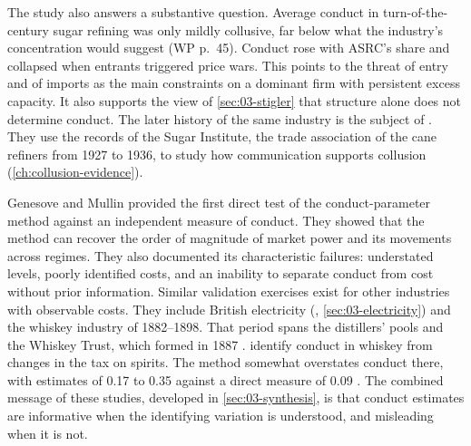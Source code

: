 The study also answers a substantive question. Average conduct in turn-of-the-century sugar refining was
only mildly collusive, far below what the industry's concentration would suggest (WP p.~45). Conduct rose
with ASRC's share and collapsed when entrants triggered price wars. This points to the threat of entry and
of imports as the main constraints on a dominant firm with persistent excess capacity. It also supports the
view of \cref{sec:03-stigler} that structure alone does not determine conduct. The later history of the same
industry is the subject of \citet{GenesoveMullin2001}. They use the records of the Sugar Institute, the
trade association of the cane refiners from 1927 to 1936, to study how communication supports collusion
(\cref{ch:collusion-evidence}).

Genesove and Mullin provided the first direct test of the conduct-parameter method against an independent
measure of conduct. They showed that the method can recover the order of magnitude of market power and its
movements across regimes. They also documented its characteristic failures: understated levels, poorly
identified costs, and an inability to separate conduct from cost without prior information. Similar
validation exercises exist for other industries with observable costs. They include British electricity
(\citealp{Wolfram1999}, \cref{sec:03-electricity}) and the whiskey industry of 1882--1898. That period spans
the distillers' pools and the Whiskey Trust, which formed in 1887 \citep[p.~153]{ClayTroesken2003}.
\citet[p.~162]{ClayTroesken2003} identify conduct in whiskey from changes in the tax on
spirits. The method somewhat overstates conduct there, with estimates of 0.17 to 0.35 against a direct
measure of 0.09 \citep[p.~165]{ClayTroesken2003}. The combined message of these studies, developed in
\cref{sec:03-synthesis}, is that conduct estimates are informative when the identifying variation is
understood, and misleading when it is not.
